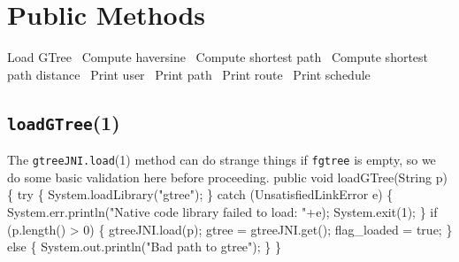 \documentclass{article}
\def\nwendcode{\endtrivlist \endgroup}      %
\let\nwdocspar=\par
\begin{document}
\section{Public Methods}
\nwenddocs{}\endmoddef{}
  \LA{}Load GTree~{\nwtagstyle{}}\RA{}
  \LA{}Compute haversine~{\nwtagstyle{}}\RA{}
  \LA{}Compute shortest path~{\nwtagstyle{}}\RA{}
  \LA{}Compute shortest path distance~{\nwtagstyle{}}\RA{}
  \LA{}Print user~{\nwtagstyle{}}\RA{}
  \LA{}Print path~{\nwtagstyle{}}\RA{}
  \LA{}Print route~{\nwtagstyle{}}\RA{}
  \LA{}Print schedule~{\nwtagstyle{}}\RA{}
\nwendcode{}\nwdocspar

\subsection{{\tt{}\protect{}\protect{}loadGTree}(1)}
The {\tt{}gtreeJNI.load}(1) method can do strange things if {\tt{}f{}gtree} is empty,
so we do some basic validation here before proceeding.
\nwenddocs{}\endmoddef{}
public void loadGTree(String p) \{
  try \{
    System.loadLibrary("gtree");
  \} catch (UnsatisfiedLinkError e) \{
    System.err.println("Native code library failed to load: "+e);
    System.exit(1);
  \}
  if (p.length() > 0) \{
    gtreeJNI.load(p);
    gtree = gtreeJNI.get();
    flag_loaded = true;
  \} else \{
    System.out.println("Bad path to gtree");
  \}
\}
\eatline
{}\nwendcode{}\nwdocspar
\end{document}
